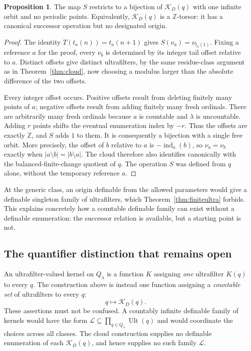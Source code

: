 \documentclass[11pt,letterpaper]{article}
\theoremstyle{definition}
\newtheorem{proposition}[definition]{Proposition}
\numberwithin{equation}{section}
\newcommand{\UFilt}{\operatorname{Ult}}
\begin{document}
\begin{proposition}\label{prop:torsor}
The map $S$ restricts to a bijection of $\mathcal K_D(q)$ with one infinite orbit and no periodic points. Equivalently, $\mathcal K_D(q)$ is a $\mathbb Z$-torsor: it has a canonical successor operation but no designated origin.
\end{proposition}
\begin{proof}
The identity $T(t_a(n))=t_a(n+1)$ gives $S(\nu_a)=\nu_{t_a(1)}$. Fixing a reference $a$ for the proof, every $\nu_b$ is determined by its integer tail offset relative to $a$. Distinct offsets give distinct ultrafilters, by the same residue-class argument as in Theorem~\ref{thm:cloud}, now choosing a modulus larger than the absolute difference of the two offsets.

Every integer offset occurs. Positive offsets result from deleting finitely many points of $a$; negative offsets result from adding finitely many fresh ordinals. There are arbitrarily many fresh ordinals because $a$ is countable and $\lambda$ is uncountable. Adding $r$ points shifts the eventual enumeration index by $-r$. Thus the offsets are exactly $\mathbb Z$, and $S$ adds $1$ to them. It is consequently a bijection with a single free orbit. More precisely, the offset of $b$ relative to $a$ is $-\operatorname{ind}_a(b)$, so $\nu_a=\nu_b$ exactly when $|a\setminus b|=|b\setminus a|$. The cloud therefore also identifies canonically with the balanced-finite-change quotient of $q$. The operation $S$ was defined from $q$ alone, without the temporary reference $a$.
\end{proof}

At the generic class, an origin definable from the allowed parameters would give a definable singleton family of ultrafilters, which Theorem~\ref{thm:finiteultra} forbids. This explains concretely how a countable definable family can exist without a definable enumeration: the successor relation is available, but a starting point is not.

\subsection{The quantifier distinction that remains open}

An ultrafilter-valued kernel on $Q_\lambda$ is a function $K$ assigning \emph{one} ultrafilter $K(q)$ to every $q$. The construction above is instead one function assigning a \emph{countable set} of ultrafilters to every $q$:
\[
 q\longmapsto\mathcal K_D(q).
\]
These assertions must not be confused. A countably infinite definable family of kernels would have the form $\mathcal L\subseteq\prod_{q\in Q_\lambda}\UFilt(q)$ and would coordinate the choices across all classes. The cloud construction supplies no definable enumeration of each $\mathcal K_D(q)$, and hence supplies no such family $\mathcal L$.
\end{document}

